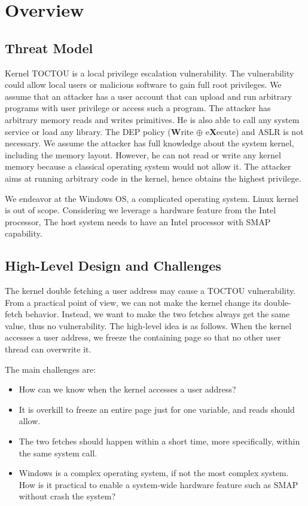 \section{Overview}
\label{sec:ktoctou-overview}




\subsection{Threat Model}
\label{sec:ktoctou-threatmodel}

Kernel TOCTOU is a local privilege escalation vulnerability. The vulnerability could allow local users or malicious software to gain full root privileges. We assume that an attacker has a user account that can upload and run arbitrary programs with user privilege or access such a program. The attacker has arbitrary memory reads and writes primitives. He is also able to call any system service or load any library. The DEP policy (\textbf{W}rite $\oplus$ e\textbf{X}ecute) and ASLR is not necessary. We assume the attacker has full knowledge about the system kernel, including the memory layout. However, he can not read or write any kernel memory because a classical operating system would not allow it. The attacker aims at running arbitrary code in the kernel, hence obtains the highest privilege.

We endeavor at the Windows OS, a complicated operating system. Linux kernel is out of scope. %
Considering we leverage a hardware feature from the Intel processor, The host system needs to have an Intel processor with SMAP capability.

\subsection{High-Level Design and Challenges}

The kernel double fetching a user address may cause a TOCTOU vulnerability. From a practical point of view, we can not make the kernel change its double-fetch behavior. Instead, we want to make the two fetches always get the same value, thus no vulnerability. The high-level idea is as follows.  When the kernel accesses a user address, we freeze the containing page so that no other user thread can overwrite it.


The main challenges are:

\begin{itemize}
	\item How can we know when the kernel accesses a user address?
	\item It is overkill to freeze an entire page just for one variable, and reads should allow.
	\item The two fetches should happen within a short time, more specifically, within the same system call.
	\item Windows is a complex operating system, if not the most complex system. How is it practical to enable a system-wide hardware feature such as SMAP without crash the system?
\end{itemize}



